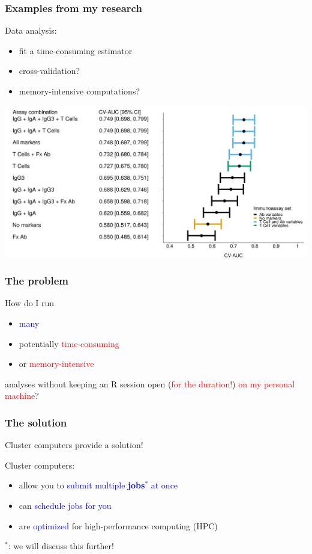 \documentclass[12pt, 
hyperref={colorlinks=true, linkcolor=BlueViolet, urlcolor=BlueViolet},dvipsnames]{beamer}
\begin{document}
\begin{frame}
\frametitle{Examples from my research}
\textcolor{BurntOrange}{Data analysis}: \vspace{-0.3cm} \pause
\begin{itemize}
\item fit a time-consuming estimator \pause
\item cross-validation? \pause
\item memory-intensive computations? \pause
\end{itemize}

\begin{center}
\includegraphics[width = 1\textwidth]{plots/cv_auc_forest_plot_sl.png}
\end{center}
\end{frame}

\begin{frame}
\frametitle{The problem}
How do I run\vspace{-0.3cm} \pause
\begin{itemize}
\item \textcolor{blue}{many} \pause
\item potentially \textcolor{red}{time-consuming} \pause
\item or \textcolor{red}{memory-intensive} \pause
\end{itemize}
analyses without \pause keeping an R session open (\textcolor{red}{for the duration!}) \pause \textcolor{red}{on my personal machine}?
\end{frame}

\begin{frame}
\frametitle{The solution}
Cluster computers provide a solution! \pause

Cluster computers: \vspace{-0.3cm} \pause
\begin{itemize}
\item allow you to \textcolor{blue}{submit multiple \textbf{jobs}${}^*$ at once} \pause
\item can \textcolor{blue}{schedule jobs for you} \pause
\item are \textcolor{blue}{optimized} for high-performance computing (HPC) \pause
\end{itemize}

{\small ${}^*$: we will discuss this further!}
\end{frame}
\end{document}
